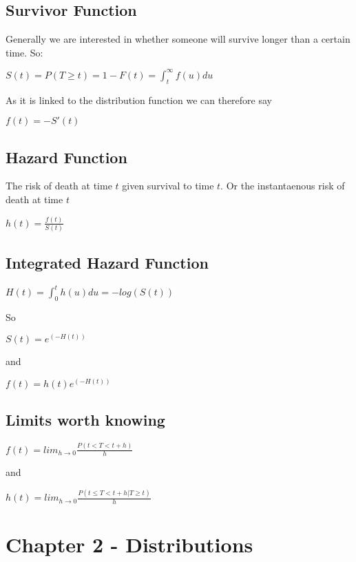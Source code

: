 \documentclass[
  letterpaper,
  DIV=11,
  numbers=noendperiod]{scrreprt}
\begin{document}
\hypertarget{survivor-function}{%
\subsection{Survivor Function}\label{survivor-function}}

Generally we are interested in whether someone will survive longer than
a certain time. So:

\(S(t) = P(T\geq t) = 1 - F(t) = \int^{\infty}_t f(u) du\)

As it is linked to the distribution function we can therefore say

\(f(t) = -S'(t)\)

\hypertarget{hazard-function}{%
\subsection{Hazard Function}\label{hazard-function}}

The risk of death at time \(t\) given survival to time \(t\). Or the
instantaenous risk of death at time \(t\)

\(h(t) = \frac{f(t)}{S(t)}\)

\hypertarget{integrated-hazard-function}{%
\subsection{Integrated Hazard
Function}\label{integrated-hazard-function}}

\(H(t) = \int^{t}_0 h(u) du = -log(S(t))\)

So

\(S(t) = e^{\left(-H(t)\right)}\)

and

\(f(t) = h(t)e^{\left(-H(t)\right)}\)

\hypertarget{limits-worth-knowing}{%
\subsection{Limits worth knowing}\label{limits-worth-knowing}}

\(f(t) = lim_{h \rightarrow 0 } \frac{P(t < T < t+h)}{h}\)

and

\(h(t) = lim_{h \rightarrow 0 } \frac{P(t \leq T < t+h | T \geq t)}{h}\)

\hypertarget{chapter-2---distributions}{%
\section{Chapter 2 - Distributions}\label{chapter-2---distributions}}
\end{document}
